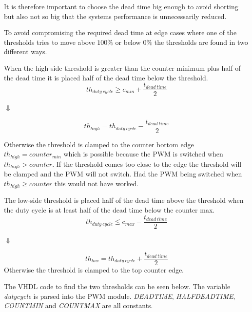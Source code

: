 It is therefore important to choose the dead time big enough to avoid shorting but also not so big that the systems performance is unnecessarily reduced.
\bigskip


To avoid compromising the required dead time at edge cases where one of the thresholds tries to move above $100 \%$ or  below $0 \%$ the thresholds are found in two different ways.





When the high-side threshold is greater than the counter minimum plus half of the dead time it is placed half of the dead time below the threshold.
\begin{equation}
    th_{duty \ cycle} \geq  c_{min} + \frac{t_{dead \ time}}{2}
    \label{eq:threshold_high_condition}
\end{equation}
\begin{center}
    $\Downarrow$    
\end{center}
\begin{equation}
   th_{high} = th_{duty \ cycle} - \frac{t_{dead \ time}}{2}  
   \label{eq:threshold_high_equation}
\end{equation}

Otherwise the threshold is clamped to the counter bottom edge $th_{high} = counter_{min}$ which is possible because the PWM is switched when $th_{high} > counter$.
If the threshold comes too close to the edge the threshold will be clamped and the PWM will not switch. Had the PWM being switched when $th_{high} \geq counter$ this would not have worked.



The low-side threshold is placed half of the dead time above the threshold when the duty cycle is at least half of the dead time below the counter max.
\begin{equation}
    th_{duty \ cycle}\leq c_{max} - \frac{t_{dead \ time}}{2}
    \label{eq:threshold_low_condition}
\end{equation}
\begin{center}
    $\Downarrow$
\end{center}
\begin{equation}
  th_{low} = th_{duty \ cycle} + \frac{t_{dead \ time}}{2}  
  \label{eq:threshold_low_equation}
\end{equation}
Otherwise the threshold is clamped to the top counter edge.

The VHDL code to find the two thresholds can be seen below. The variable \textit{duty\textunderscore cycle} is parsed into the PWM module. \textit{DEADTIME}, \textit{HALF\textunderscore DEADTIME}, \textit{COUNT\textunderscore MIN} and \textit{COUNT\textunderscore MAX} are all constants.

